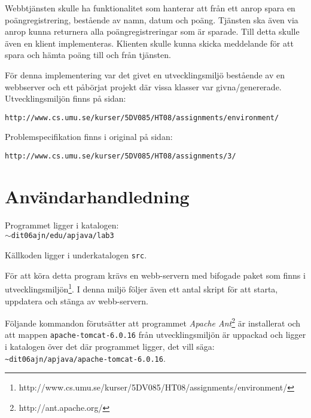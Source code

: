 \documentclass[a4paper, 12pt]{article}
\def\pathtocode{$\sim$dit06ajn/edu/apjava/lab3}
\begin{document}
Webbtjänsten skulle ha funktionalitet som hanterar att från ett anrop
spara en poängregistrering, bestående av namn, datum och
poäng. Tjänsten ska även via anrop kunna returnera alla
poängregistreringar som är sparade. Till detta skulle även en klient
implementeras. Klienten skulle kunna skicka meddelande för att spara
och hämta poäng till och från tjänsten.

För denna implementering var det givet en utvecklingsmiljö bestående
av en webbserver och ett påbörjat projekt där vissa klasser var
givna/genererade. Utvecklingsmiljön finns på sidan:\\
\begin{footnotesize}
\verb!http://www.cs.umu.se/kurser/5DV085/HT08/assignments/environment/!
\end{footnotesize}

Problemspecifikation finns i original på sidan:\\
\begin{footnotesize}
\verb!http://www.cs.umu.se/kurser/5DV085/HT08/assignments/3/!
\end{footnotesize}

\section{Användarhandledning}\label{Anvandarhandledning}

Programmet ligger i katalogen:\\
\texttt{\pathtocode}

Källkoden ligger i underkatalogen \verb!src!.

För att köra detta program krävs en webb-servern med bifogade paket
som finns i
utvecklingsmiljön\footnote{http://www.cs.umu.se/kurser/5DV085/HT08/assignments/environment/}.
I denna miljö följer även ett antal skript för att starta,
uppdatera och stänga av webb-servern.

Följande kommandon förutsätter att programmet \textit{Apache
  Ant}\footnote{http://ant.apache.org/} är installerat och att mappen
\verb!apache-tomcat-6.0.16!  från utvecklingsmiljön är uppackad och
ligger i katalogen över det där programmet ligger, det vill säga:
\verb!~dit06ajn/apjava/apache-tomcat-6.0.16!.
\end{document}
